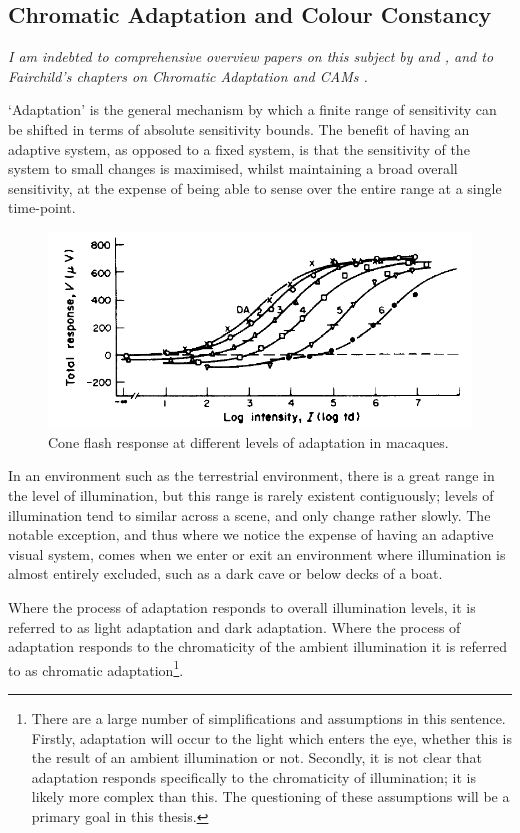 \subsection{Chromatic Adaptation and Colour Constancy}

\textit{I am indebted to comprehensive overview papers on this subject by \citet{foster_color_2011} and \citet{smithson_sensory_2005}, and to Fairchild's chapters on Chromatic Adaptation and \glspl{CAM} \citep[ch. 8 \& 9]{fairchild_color_2013}.}

\bigskip

`Adaptation' is the general mechanism by which a finite range of sensitivity can be shifted in terms of absolute sensitivity bounds. The benefit of having an adaptive system, as opposed to a fixed system, is that the sensitivity of the system to small changes is maximised, whilst maintaining a broad overall sensitivity, at the expense of being able to sense over the entire range at a single time-point. 

\begin{figure}[htbp]
\includegraphics[max width=\textwidth]{figs/LitRev/Valeton.png}
\caption{Cone flash response at different levels of adaptation in macaques.}
\label{fig:Valeton}
\end{figure}

In an environment such as the terrestrial environment, there is a great range in the level of illumination, but this range is rarely existent contiguously; levels of illumination tend to similar across a scene, and only change rather slowly. The notable exception, and thus where we notice the expense of having an adaptive visual system, comes when we enter or exit an environment where illumination is almost entirely excluded, such as a dark cave or below decks of a boat. 

Where the process of adaptation responds to overall illumination levels, it is referred to as light adaptation and dark adaptation. Where the process of adaptation responds to the chromaticity of the ambient illumination it is referred to as chromatic adaptation\footnote{There are a large number of simplifications and assumptions in this sentence. Firstly, adaptation will occur to the light which enters the eye, whether this is the result of an ambient illumination or not. Secondly, it is not clear that adaptation responds specifically to the chromaticity of illumination; it is likely more complex than this. The questioning of these assumptions will be a primary goal in this thesis.}.

